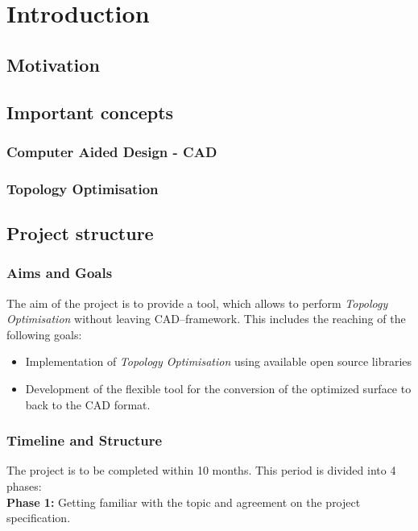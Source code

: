 \chapter{Introduction}
\label{chapter:Introduction}

\section{Motivation}


\section{Important concepts}

\subsection{Computer Aided Design - CAD}

\subsection{Topology Optimisation}

\section{Project structure}
\subsection{Aims and Goals}
The aim of the project is to provide a tool, which allows to perform \textit{Topology Optimisation} without leaving CAD--framework. This includes the reaching of the following goals:
\begin{itemize}
\item Implementation of \textit{Topology Optimisation} using available open source libraries
\item Development of the flexible tool for the conversion of the optimized surface to back to the CAD format.
\end{itemize}
\subsection{Timeline and Structure}
The project is to be completed within 10 months. This period is divided into 4 phases:\\

\textbf{Phase 1:} Getting familiar with the topic and agreement on the project specification.\\

